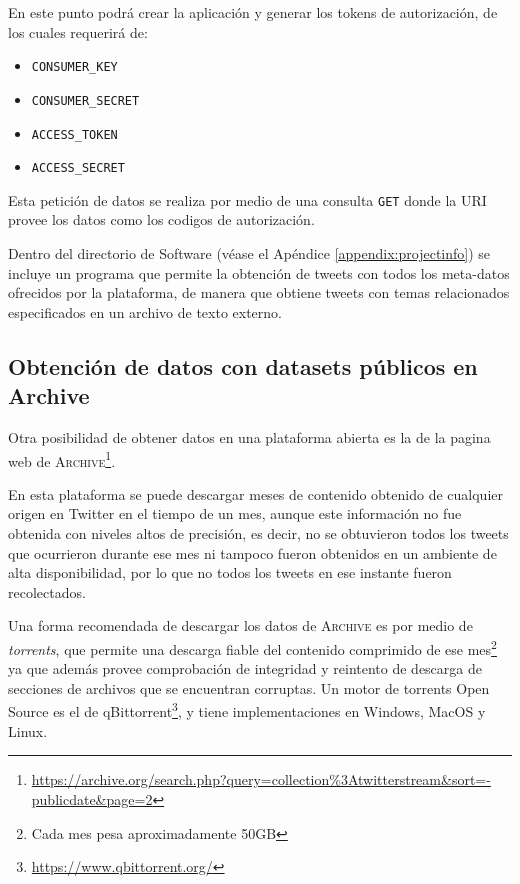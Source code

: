 En este punto podrá crear la aplicación y generar los tokens de autorización, de los cuales requerirá de:
\begin{itemize}
\item \texttt{CONSUMER\_KEY}
\item \texttt{CONSUMER\_SECRET}
\item \texttt{ACCESS\_TOKEN}
\item \texttt{ACCESS\_SECRET}
\end{itemize}

Esta petición de datos se realiza por medio de una consulta \texttt{GET} donde la URI provee los datos como los codigos de autorización.

Dentro del directorio de Software (véase el Apéndice \ref{appendix:projectinfo}) se incluye un programa que permite la obtención de tweets con todos los meta-datos ofrecidos por la plataforma, de manera que obtiene tweets con temas relacionados especificados en un archivo de texto externo.

\subsection{Obtención de datos con datasets públicos en Archive} \label{subsec:twitterarchive}
Otra posibilidad de obtener datos en una plataforma abierta es la de la pagina web de \textsc{Archive}\footnote{\href{https://archive.org/search.php?query=collection\%3Atwitterstream\&sort=-publicdate\&page=2}{https://archive.org/search.php?query=collection\%3Atwitterstream\&sort=-publicdate\&page=2}}.

En esta plataforma se puede descargar meses de contenido obtenido de cualquier origen en Twitter en el tiempo de un mes, aunque este información no fue obtenida con niveles altos de precisión, es decir, no se obtuvieron todos los tweets que ocurrieron durante ese mes ni tampoco fueron obtenidos en un ambiente de alta disponibilidad, por lo que no todos los tweets en ese instante fueron recolectados.

Una forma recomendada de descargar los datos de \textsc{Archive} es por medio de \emph{torrents}, que permite una descarga fiable del contenido comprimido de ese mes\footnote{Cada mes pesa aproximadamente 50GB} ya que además provee comprobación de integridad y reintento de descarga de secciones de archivos que se encuentran corruptas. Un motor de torrents Open Source es el de qBittorrent\footnote{\href{https://www.qbittorrent.org/}{https://www.qbittorrent.org/}}, y tiene implementaciones en Windows, MacOS y Linux.

